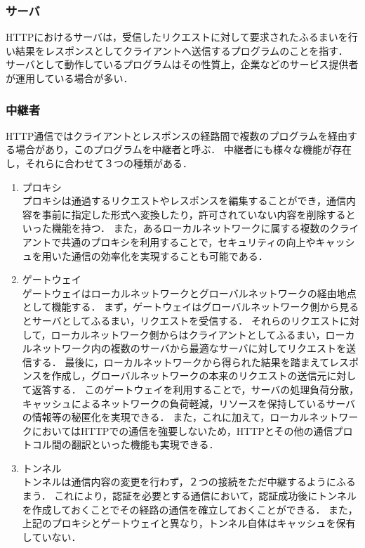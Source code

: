 \documentclass[12pt,a4paper]{jbook}
\begin{document}
\subsubsection{サーバ}
HTTPにおけるサーバは，受信したリクエストに対して要求されたふるまいを行い結果をレスポンスとしてクライアントへ送信するプログラムのことを指す．
サーバとして動作しているプログラムはその性質上，企業などのサービス提供者が運用している場合が多い．

\subsubsection{中継者}
\label{sec:intermediary}
HTTP通信ではクライアントとレスポンスの経路間で複数のプログラムを経由する場合があり，このプログラムを中継者と呼ぶ．
中継者にも様々な機能が存在し，それらに合わせて３つの種類がある．
\begin{enumerate}
\item プロキシ\\
プロキシは通過するリクエストやレスポンスを編集することができ，通信内容を事前に指定した形式へ変換したり，許可されていない内容を削除するといった機能を持つ．
また，あるローカルネットワークに属する複数のクライアントで共通のプロキシを利用することで，セキュリティの向上やキャッシュを用いた通信の効率化を実現することも可能である．
\item ゲートウェイ\\
ゲートウェイはローカルネットワークとグローバルネットワークの経由地点として機能する．
まず，ゲートウェイはグローバルネットワーク側から見るとサーバとしてふるまい，リクエストを受信する．
それらのリクエストに対して，ローカルネットワーク側からはクライアントとしてふるまい，ローカルネットワーク内の複数のサーバから最適なサーバに対してリクエストを送信する．
最後に，ローカルネットワークから得られた結果を踏まえてレスポンスを作成し，グローバルネットワークの本来のリクエストの送信元に対して返答する．
このゲートウェイを利用することで，サーバの処理負荷分散，キャッシュによるネットワークの負荷軽減，リソースを保持しているサーバの情報等の秘匿化を実現できる．
また，これに加えて，ローカルネットワークにおいてはHTTPでの通信を強要しないため，HTTPとその他の通信プロトコル間の翻訳といった機能も実現できる．
\item トンネル\\
トンネルは通信内容の変更を行わず，２つの接続をただ中継するようにふるまう．
これにより，認証を必要とする通信において，認証成功後にトンネルを作成しておくことでその経路の通信を確立しておくことができる．
また，上記のプロキシとゲートウェイと異なり，トンネル自体はキャッシュを保有していない．
\end{enumerate}
\end{document}
